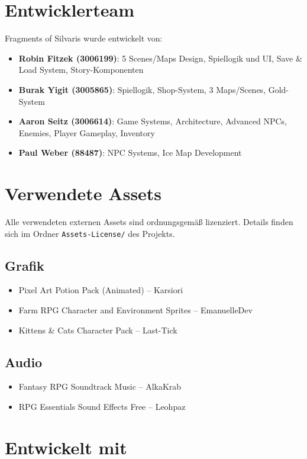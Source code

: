\documentclass[
  a4paper,
  11pt,
  ngerman,
  parskip=half,
  bibliography=totoc,
  listof=totoc
]{scrreprt}
\begin{document}
\section{Entwicklerteam}

Fragments of Silvaris wurde entwickelt von:

\begin{itemize}
    \item \textbf{Robin Fitzek (3006199)}: 5 Scenes/Maps Design, Spiellogik und UI, Save \& Load System, Story-Komponenten
    \item \textbf{Burak Yigit (3005865)}: Spiellogik, Shop-System, 3 Maps/Scenes, Gold-System
    \item \textbf{Aaron Seitz (3006614)}: Game Systems, Architecture, Advanced NPCs, Enemies, Player Gameplay, Inventory
    \item \textbf{Paul Weber (88487)}: NPC Systems, Ice Map Development
\end{itemize}

\section{Verwendete Assets}

Alle verwendeten externen Assets sind ordnungsgemäß lizenziert. Details finden sich im Ordner \texttt{Assets-License/} des Projekts.

\subsection{Grafik}
\begin{itemize}
    \item Pixel Art Potion Pack (Animated) -- Karsiori
    \item Farm RPG Character and Environment Sprites -- EmanuelleDev
    \item Kittens \& Cats Character Pack -- Last-Tick
\end{itemize}

\subsection{Audio}
\begin{itemize}
    \item Fantasy RPG Soundtrack Music -- AlkaKrab
    \item RPG Essentials Sound Effects Free -- Leohpaz
\end{itemize}

\section{Entwickelt mit}
\end{document}
